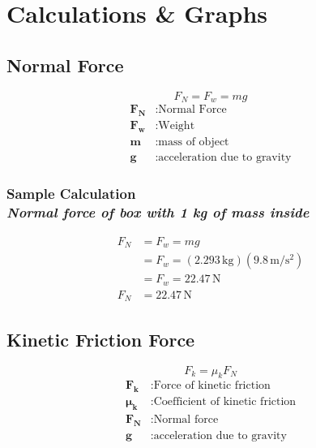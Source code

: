 
\section{Calculations \& Graphs}

\vspace{-0.5cm}
\singlespacing


\subsection{Normal Force} 

{\centering
\begin{equation}
	F_N = F_w = mg
	\label{eq:nForce}
\end{equation}
\begin{align*}
	\boldsymbol{F_N} &: \text{Normal Force} \\
	\boldsymbol{F_w} &: \text{Weight} \\
	\boldsymbol{m} &: \text{mass of object} \\
	\boldsymbol{g} &: \text{acceleration due to gravity}
\end{align*}}

\subsubsection{Sample Calculation \\ {\normalfont \small\textit{Normal force of box with 1 kg of mass inside}}}

{\centering
\begin{align*}
	F_N &= F_w = mg \\
			&= F_w = (2.293\,\text{kg})(9.8\,\text{m/s$^2$}) \\
			&= F_w = 22.47\,\text{N} \\
	F_N &= \boxed{22.47\,\text{N}}
\end{align*}}

\subsection{Kinetic Friction Force}

{\centering
\begin{equation}
	F_k =\mu_k F_N 
	\label{eq:kFriction}
\end{equation}
\begin{align*}
	\boldsymbol{F_k} &: \text{Force of kinetic friction} \\
	\boldsymbol{\mu_k} &: \text{Coefficient of kinetic friction} \\
	\boldsymbol{F_N} &: \text{Normal force} \\
	\boldsymbol{g} &: \text{acceleration due to gravity}
\end{align*}}

